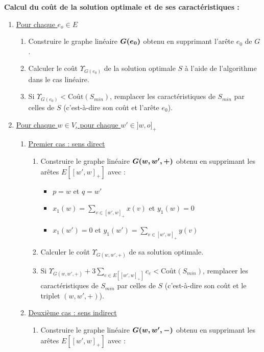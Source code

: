 \textbf{Calcul du coût de la solution optimale et de ses caractéristiques :}
\begin{enumerate}
\item\label{Ze0 nul} \uline{Pour chaque $e_o \in E$}
  \begin{enumerate}
  \item Construire le graphe linéaire $\boldsymbol{G(e_0)}$ obtenu en supprimant l'arête $e_0$ de $G$.
  \item Calculer le coût $\Upsilon_{G(e_0)}$ de la solution optimale $S$ à l'aide de l'algorithme dans le cas linéaire.
  \item Si $\Upsilon_{G(e_0)} < \mbox{Coût}(S_{min})$, remplacer les caractéristiques de $S_{min}$ par celles de $S$ (c'est-à-dire son coût et l'arête $e_0$).
  \end{enumerate}
\item\label{Ze0 unitaire} \uline{Pour chaque $w \in V$, pour chaque $w' \in ]w,o]_+$}
  \begin{enumerate}
  \item \uline{Premier cas : sens direct}
    \begin{enumerate}
    \item\label{Ze0 unitaire - direct} Construire le graphe linéaire $\boldsymbol{G(w,w',+)}$ obtenu en supprimant les arêtes $E\left[ \left[w',w\right]_+ \right]$ avec :
      \begin{itemize}
      \item $p=w$ et $q=w'$
      \item $x_1(w) = \sum_{v \in \left[w',w\right]_+} x(v)$ et $y_1(w) = 0$
      \item $x_1(w') = 0$ et $y_1(w') = \sum_{v \in \left[w',w\right]_+} y(v)$
      \end{itemize}
    \item Calculer le coût $\Upsilon_{G(w,w',+)}$ de sa solution optimale.
    \item Si $\Upsilon_{G(w,w',+)} + 3 \sum_{ e \in E\left[ \left[w',w\right]_+ \right] }c_e < \mbox{Coût}(S_{min})$, remplacer les caractéristiques de $S_{min}$ par celles de $S$ (c'est-à-dire son coût et le triplet $(w,w',+)$).
    \end{enumerate}
  \item\label{Ze0 unitaire - indirect} \uline{Deuxième cas : sens indirect}
    \begin{enumerate}
    \item Construire le graphe linéaire $\boldsymbol{G(w,w',-)}$ obtenu en supprimant les arêtes $E\left[ \left[w',w\right]_+ \right]$ avec :
      \begin{itemize}

\end{itemize}
\end{enumerate}
\end{enumerate}
\end{enumerate}
